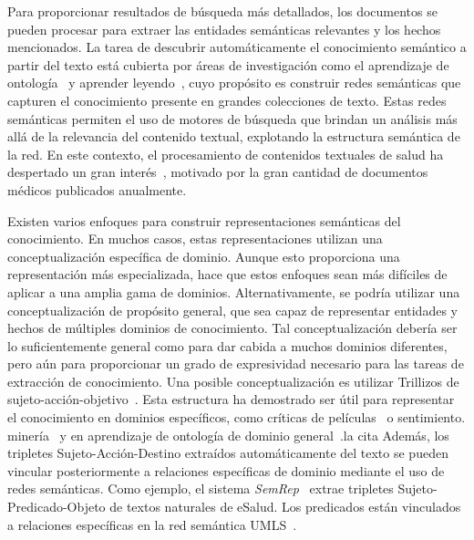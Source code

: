 Para proporcionar resultados de búsqueda más detallados, los documentos se pueden procesar para extraer las entidades semánticas relevantes y los hechos mencionados.
La tarea de descubrir automáticamente el conocimiento semántico a partir del texto está cubierta por áreas de investigación como el aprendizaje de ontología~\cite{cimiano2009ontology} y {aprender leyendo}~\cite{barker2007learning},
cuyo propósito es construir redes semánticas que {capturen} el conocimiento presente en grandes colecciones de texto.
Estas redes semánticas permiten el uso de motores de búsqueda que brindan un análisis más allá de la relevancia del contenido textual, explotando la estructura semántica de la red.
En este contexto, el procesamiento de contenidos textuales de salud ha despertado un {gran interés}~\cite{gonzalez2017capturing}, motivado por la gran cantidad de documentos médicos publicados anualmente.

Existen varios enfoques para construir representaciones semánticas del conocimiento.
En muchos casos, estas representaciones utilizan una conceptualización específica de dominio.
Aunque esto proporciona una representación más especializada, hace que estos enfoques sean más difíciles de aplicar a una amplia gama de dominios.
Alternativamente, se podría utilizar una conceptualización de propósito general, que sea capaz de representar entidades y hechos de múltiples dominios de conocimiento.
Tal conceptualización debería ser lo suficientemente general como para dar cabida a muchos dominios diferentes, pero aún para proporcionar un grado de expresividad necesario para las tareas de extracción de conocimiento.
Una posible conceptualización es utilizar
{Trillizos de sujeto-acción-objetivo}~\cite{suilan2018}.
Esta estructura ha demostrado ser útil para representar el conocimiento en dominios específicos, como críticas de películas~\cite{suilan2018} o sentimiento.
minería~\cite{emotinet} y en {aprendizaje de ontología de dominio general}~\cite{mitchell2018never}.la cita
Además, los tripletes Sujeto-Acción-Destino extraídos automáticamente del texto se pueden vincular posteriormente a relaciones específicas de dominio mediante el uso de redes semánticas.
Como ejemplo, el sistema \textit{SemRep}~\cite{semrep} extrae tripletes Sujeto-Predicado-Objeto de textos naturales de eSalud. Los predicados están vinculados a relaciones específicas en la red semántica UMLS~\cite{umls}.

